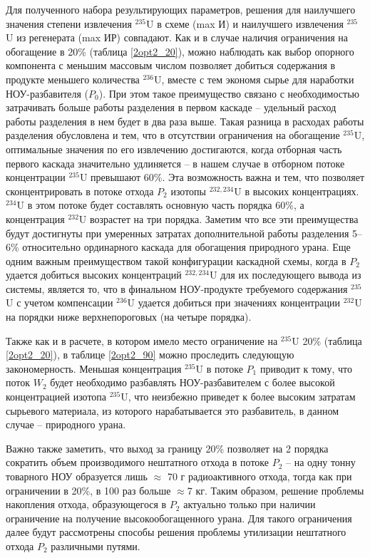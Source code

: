 Для полученного набора результирующих параметров, решения для наилучшего значения степени извлечения $^{235}$U в схеме (max И) и наилучшего извлечения $^{235}$U из регенерата (max ИР) совпадают. Как и в случае наличия ограничения на обогащение в 20\% (таблица \ref{2opt2_20}), можно наблюдать как выбор опорного компонента с меньшим массовым числом позволяет добиться содержания в продукте меньшего количества $^{236}$U, вместе с тем экономя сырье для наработки НОУ-разбавителя ($P_{0}$). При этом такое преимущество связано с необходимостью затрачивать больше работы разделения в первом каскаде -- удельный расход работы разделения в нем будет в два раза выше. Такая разница в расходах работы разделения обусловлена и тем, что в отсутствии ограничения на обогащение $^{235}$U, оптимальные значения по его извлечению достигаются, когда отборная часть первого каскада значительно удлиняется -- в нашем случае в отборном потоке концентрации $^{235}$U превышают 60\%. Эта возможность важна и тем, что позволяет сконцентрировать в потоке отхода $P_{2}$ изотопы $^{232,234}$U в высоких концентрациях. $^{234}$U в этом потоке будет составлять основную часть порядка 60\%, а концентрация $^{232}$U возрастет на три порядка. Заметим что все эти преимущества будут достигнуты при умеренных затратах дополнительной работы разделения 5--6\% относительно ординарного каскада для обогащения природного урана. Еще одним важным преимуществом такой конфигурации каскадной схемы, когда в $P_{2}$ удается добиться высоких  концентраций $^{232,234}$U для их последующего вывода из системы, является то, что в финальном НОУ-продукте требуемого содержания $^{235}$U с учетом компенсации $^{236}$U удается добиться при значениях концентрации $^{232}$U на порядки ниже верхнепороговых (на четыре порядка).

Также как и в расчете, в котором имело место ограничение на $^{235}$U 20\% (таблица \ref{2opt2_20}), в таблице \ref{2opt2_90} можно проследить следующую закономерность. Меньшая концентрация $^{235}$U в потоке $P_{1}$ приводит к тому, что поток $W_{2}$ будет необходимо разбавлять НОУ-разбавителем с более высокой концентрацией изотопа $^{235}$U, что неизбежно приведет к более высоким затратам сырьевого материала, из которого нарабатывается это разбавитель, в данном случае -- природного урана.

Важно также заметить, что выход за границу 20\% позволяет на 2 порядка сократить объем производимого нештатного отхода в потоке $P_{2}$ -- на одну тонну товарного НОУ образуется лишь $\approx$ 70 г радиоактивного отхода, тогда как при ограничении в 20\%, в 100 раз больше $\approx$7 кг. Таким образом, решение проблемы накопления отхода, образующегося в $P_{2}$ актуально только при наличии ограничение на получение высокообогащенного урана. Для такого ограничения далее будут рассмотрены способы решения проблемы утилизации нештатного отхода $P_{2}$ различными путями. 


